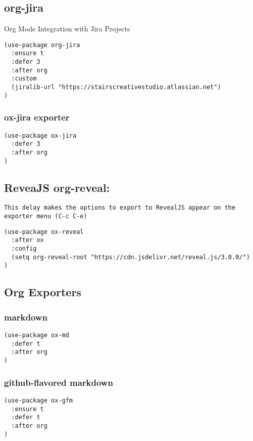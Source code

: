 \documentclass[11pt]{article}
\begin{document}
\subsection*{org-jira}
\label{sec:org4714ffe}

Org Mode Integration with Jira Projects

\begin{verbatim}
(use-package org-jira
  :ensure t
  :defer 3
  :after org
  :custom
  (jiralib-url "https://stairscreativestudio.atlassian.net")
)
\end{verbatim}

\subsubsection*{ox-jira exporter}
\label{sec:orge5fd56b}
\begin{verbatim}
(use-package ox-jira
  :defer 3
  :after org
)
\end{verbatim}


\subsection*{ReveaJS org-reveal:}
\label{sec:org6458414}

\begin{verbatim}
This delay makes the options to export to RevealJS appear on the exporter menu (C-c C-e)
\end{verbatim}


\begin{verbatim}
(use-package ox-reveal
  :after ox
  :config
  (setq org-reveal-root "https://cdn.jsdelivr.net/reveal.js/3.0.0/")
)
\end{verbatim}

\subsection*{Org Exporters}
\label{sec:org25ab9be}

\subsubsection*{markdown}
\label{sec:orgf1d6c7e}
\begin{verbatim}
(use-package ox-md
  :defer t
  :after org
)
\end{verbatim}

\subsubsection*{github-flavored markdown}
\label{sec:org35557d4}
\begin{verbatim}
(use-package ox-gfm
  :ensure t
  :defer t
  :after org
)
\end{verbatim}
\end{document}
